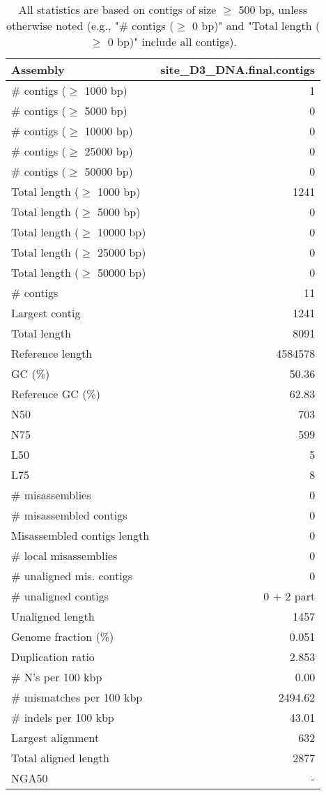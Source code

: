 \documentclass[12pt,a4paper]{article}
\begin{document}
\begin{table}[ht]
\begin{center}
\caption{All statistics are based on contigs of size $\geq$ 500 bp, unless otherwise noted (e.g., "\# contigs ($\geq$ 0 bp)" and "Total length ($\geq$ 0 bp)" include all contigs).}
\begin{tabular}{|l*{1}{|r}|}
\hline
Assembly & site\_D3\_DNA.final.contigs \\ \hline
\# contigs ($\geq$ 1000 bp) & 1 \\ \hline
\# contigs ($\geq$ 5000 bp) & 0 \\ \hline
\# contigs ($\geq$ 10000 bp) & 0 \\ \hline
\# contigs ($\geq$ 25000 bp) & 0 \\ \hline
\# contigs ($\geq$ 50000 bp) & 0 \\ \hline
Total length ($\geq$ 1000 bp) & 1241 \\ \hline
Total length ($\geq$ 5000 bp) & 0 \\ \hline
Total length ($\geq$ 10000 bp) & 0 \\ \hline
Total length ($\geq$ 25000 bp) & 0 \\ \hline
Total length ($\geq$ 50000 bp) & 0 \\ \hline
\# contigs & 11 \\ \hline
Largest contig & 1241 \\ \hline
Total length & 8091 \\ \hline
Reference length & 4584578 \\ \hline
GC (\%) & 50.36 \\ \hline
Reference GC (\%) & 62.83 \\ \hline
N50 & 703 \\ \hline
N75 & 599 \\ \hline
L50 & 5 \\ \hline
L75 & 8 \\ \hline
\# misassemblies & 0 \\ \hline
\# misassembled contigs & 0 \\ \hline
Misassembled contigs length & 0 \\ \hline
\# local misassemblies & 0 \\ \hline
\# unaligned mis. contigs & 0 \\ \hline
\# unaligned contigs & 0 + 2 part \\ \hline
Unaligned length & 1457 \\ \hline
Genome fraction (\%) & 0.051 \\ \hline
Duplication ratio & 2.853 \\ \hline
\# N's per 100 kbp & 0.00 \\ \hline
\# mismatches per 100 kbp & 2494.62 \\ \hline
\# indels per 100 kbp & 43.01 \\ \hline
Largest alignment & 632 \\ \hline
Total aligned length & 2877 \\ \hline
NGA50 & - \\ \hline
\end{tabular}
\end{center}
\end{table}
\end{document}
